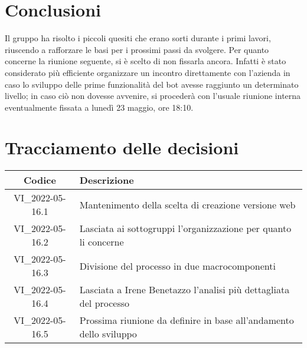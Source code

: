 \section{Conclusioni}
Il gruppo ha risolto i piccoli quesiti che erano sorti durante i primi lavori, riuscendo a rafforzare le
basi per i prossimi passi da svolgere.
\newline
Per quanto concerne la riunione seguente, si è scelto di non fissarla ancora. Infatti è stato considerato più 
efficiente organizzare un incontro direttamente con l'azienda in caso lo sviluppo delle prime funzionalità del 
bot avesse raggiunto un determinato livello; in caso ciò non dovesse avvenire, si procederà con l'usuale riunione 
interna eventualmente fissata a lunedì 23 maggio, ore 18:10.
\newpage

\section*{Tracciamento delle decisioni}
	\renewcommand{\arraystretch}{1.8} %
	\begin{tabular}{ |c|l| }
		\hline
		\textbf{Codice} & \textbf{Descrizione} \\
		\hline
		VI\_2022-05-16.1 & Mantenimento della scelta di creazione versione web\\ %
		\hline
		VI\_2022-05-16.2 & Lasciata ai sottogruppi l'organizzazione per quanto li concerne\\ %
		\hline
		VI\_2022-05-16.3 & Divisione del processo in due macrocomponenti\\ %
		\hline
		VI\_2022-05-16.4 & Lasciata a Irene Benetazzo l'analisi più dettagliata del processo\\ %
		\hline
		VI\_2022-05-16.5 & Prossima riunione da definire in base all'andamento dello sviluppo\\ %
		\hline
	\end{tabular}